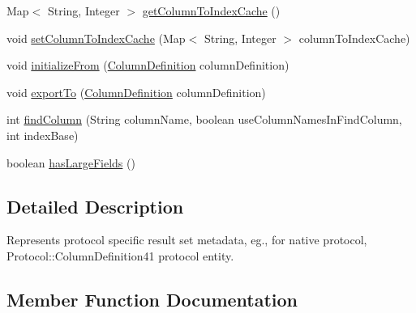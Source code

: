 \begin{DoxyCompactItemize}
\item 
Map$<$ String, Integer $>$ \mbox{\hyperlink{interfacecom_1_1mysql_1_1cj_1_1protocol_1_1_column_definition_a1317a18af8dde169cb972926f8e3521b}{get\+Column\+To\+Index\+Cache}} ()
\item 
void \mbox{\hyperlink{interfacecom_1_1mysql_1_1cj_1_1protocol_1_1_column_definition_a1972ecc1b6610bbb394af09827c4643f}{set\+Column\+To\+Index\+Cache}} (Map$<$ String, Integer $>$ column\+To\+Index\+Cache)
\item 
void \mbox{\hyperlink{interfacecom_1_1mysql_1_1cj_1_1protocol_1_1_column_definition_a3acff373088009fd3c2653b01cf0f7fe}{initialize\+From}} (\mbox{\hyperlink{interfacecom_1_1mysql_1_1cj_1_1protocol_1_1_column_definition}{Column\+Definition}} column\+Definition)
\item 
void \mbox{\hyperlink{interfacecom_1_1mysql_1_1cj_1_1protocol_1_1_column_definition_ae382d41d473df7f74ce51d22c18b1aa6}{export\+To}} (\mbox{\hyperlink{interfacecom_1_1mysql_1_1cj_1_1protocol_1_1_column_definition}{Column\+Definition}} column\+Definition)
\item 
int \mbox{\hyperlink{interfacecom_1_1mysql_1_1cj_1_1protocol_1_1_column_definition_a9082cb797c01aec299496d0d2fe41528}{find\+Column}} (String column\+Name, boolean use\+Column\+Names\+In\+Find\+Column, int index\+Base)
\item 
boolean \mbox{\hyperlink{interfacecom_1_1mysql_1_1cj_1_1protocol_1_1_column_definition_adc02edd67e54d79c7f91d41d027e44ae}{has\+Large\+Fields}} ()
\end{DoxyCompactItemize}


\subsection{Detailed Description}
Represents protocol specific result set metadata, eg., for native protocol, Protocol\+::\+Column\+Definition41 protocol entity. 

\subsection{Member Function Documentation}
\mbox{\label{interfacecom_1_1mysql_1_1cj_1_1protocol_1_1_column_definition_abadc6af9b7111fa0398649fe01a43308}} 
